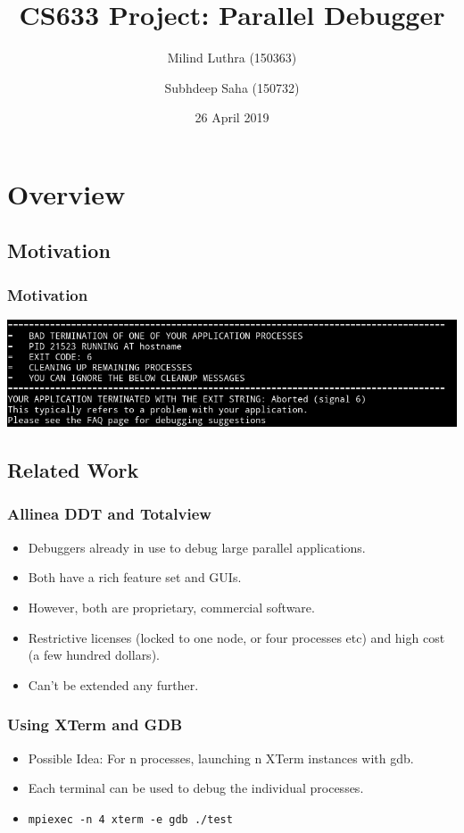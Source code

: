 \documentclass{beamer}
\title{CS633 Project: Parallel Debugger}
\author[Milind, Subhdeep]{Milind Luthra (150363) \and Subhdeep Saha (150732)}
\date{26 April 2019}
\begin{document}
\frame{\titlepage}

\section{Overview}

\subsection{Motivation}
\begin{frame}
  \frametitle{Motivation}
  \begin{center}
      \includegraphics[width=\textwidth]{motivation}
  \end{center}
\end{frame}

\subsection{Related Work}

\begin{frame}
  \frametitle{Allinea DDT and Totalview}
  \begin{itemize}
  \item <1-> Debuggers already in use to debug large parallel applications.
  \item <2-> Both have a rich feature set and GUIs.
  \item <3-> However, both are proprietary, commercial software.
  \item <5-> Restrictive licenses (locked to one node, or four processes etc) and high cost (a few hundred dollars).
  \item <6-> Can't be extended any further.
  \end{itemize}
\end{frame}

\begin{frame}[fragile]
  \frametitle{Using XTerm and GDB}
  \begin{itemize}
  \item <1-> Possible Idea: For n processes, launching n XTerm instances with gdb.
  \item <2-> Each terminal can be used to debug the individual processes.
  \item <3-> \texttt{mpiexec -n 4 xterm -e gdb ./test}
  \end{itemize}
\end{frame}
\end{document}
